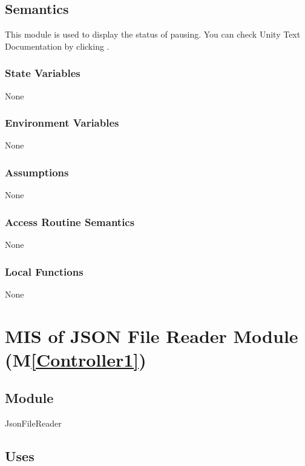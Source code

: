 \documentclass[12pt, titlepage]{article}
\newcommand{\mref}[1]{M\ref{#1}}
\begin{document}
\subsection{Semantics}
This module is used to display the status of pausing. You can
check Unity Text Documentation by clicking \tref.

\subsubsection{State Variables}
None

\subsubsection{Environment Variables}

None

\subsubsection{Assumptions}

None

\subsubsection{Access Routine Semantics}
None

\subsubsection{Local Functions}
None

\newpage

\section{MIS of JSON File Reader Module  (\mref{Controller1})}

\subsection{Module}

JsonFileReader

\subsection{Uses}
\end{document}
